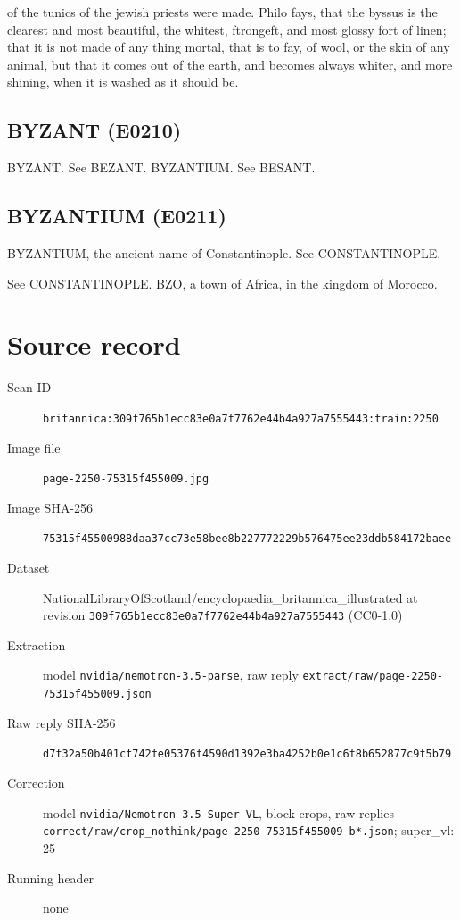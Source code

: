 \documentclass{article}
\begin{document}
of the tunics of the jewish priests were made. Philo fays, that the byssus is the clearest and most beautiful, the whitest, ftrongeft, and most glossy fort of linen; that it is not made of any thing mortal, that is to fay, of wool, or the skin of any animal, but that it comes out of the earth, and becomes always whiter, and more shining, when it is washed as it should be.

\subsection*{BYZANT (E0210)}
BYZANT. See BEZANT.
BYZANTIUM. See BESANT.

\subsection*{BYZANTIUM (E0211)}
BYZANTIUM, the ancient name of Constantinople. See CONSTANTINOPLE.

See CONSTANTINOPLE.
BZO, a town of Africa, in the kingdom of Morocco.


\section*{Source record}
\begin{description}
\item[Scan ID] \texttt{britannica:309f765b1ecc83e0a7f7762e44b4a927a7555443:train:2250}
\item[Image file] \texttt{page-2250-75315f455009.jpg}
\item[Image SHA-256] \texttt{75315f45500988daa37cc73e58bee8b227772229b576475ee23ddb584172baee}
\item[Dataset] NationalLibraryOfScotland/encyclopaedia\_britannica\_illustrated at revision \texttt{309f765b1ecc83e0a7f7762e44b4a927a7555443} (CC0-1.0)
\item[Extraction] model \texttt{nvidia/nemotron-3.5-parse}, raw reply \texttt{extract/raw/page-2250-75315f455009.json}
\item[Raw reply SHA-256] \texttt{d7f32a50b401cf742fe05376f4590d1392e3ba4252b0e1c6f8b652877c9f5b79}
\item[Correction] model \texttt{nvidia/Nemotron-3.5-Super-VL}, block crops, raw replies \texttt{correct/raw/crop\_nothink/page-2250-75315f455009-b*.json}; super\_vl: 25
\item[Running header] none
\end{description}
\end{document}
